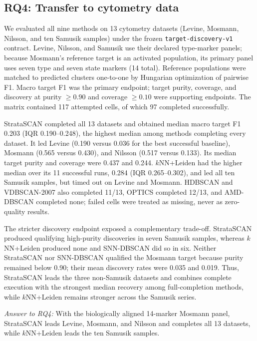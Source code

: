 \subsection{RQ4: Transfer to cytometry data}

We evaluated all nine methods on 13 cytometry datasets (Levine, Mosmann, Nilsson, and ten Samusik samples) under the frozen \texttt{target-discovery-v1} contract. Levine, Nilsson, and Samusik use their declared type-marker panels; because Mosmann's reference target is an activated population, its primary panel uses seven type and seven state markers (14 total). Reference populations were matched to predicted clusters one-to-one by Hungarian optimization of pairwise F1. Macro target F1 was the primary endpoint; target purity, coverage, and discovery at purity $\geq0.90$ and coverage $\geq0.10$ were supporting endpoints. The matrix contained 117 attempted cells, of which 97 completed successfully.

StrataSCAN completed all 13 datasets and obtained median macro target F1 0.203 (IQR 0.190--0.248), the highest median among methods completing every dataset. It led Levine (0.190 versus 0.036 for the best successful baseline), Mosmann (0.565 versus 0.430), and Nilsson (0.517 versus 0.133). Its median target purity and coverage were 0.437 and 0.244. $k$NN+Leiden had the higher median over its 11 successful runs, 0.284 (IQR 0.265--0.302), and led all ten Samusik samples, but timed out on Levine and Mosmann. HDBSCAN and VDBSCAN-2007 also completed 11/13, OPTICS completed 12/13, and AMD-DBSCAN completed none; failed cells were treated as missing, never as zero-quality results.

The stricter discovery endpoint exposed a complementary trade-off. StrataSCAN produced qualifying high-purity discoveries in seven Samusik samples, whereas $k$NN+Leiden produced none and SNN-DBSCAN did so in six. Neither StrataSCAN nor SNN-DBSCAN qualified the Mosmann target because purity remained below 0.90; their mean discovery rates were 0.035 and 0.019. Thus, StrataSCAN leads the three non-Samusik datasets and combines complete execution with the strongest median recovery among full-completion methods, while $k$NN+Leiden remains stronger across the Samusik series.

\textit{Answer to RQ4:} With the biologically aligned 14-marker Mosmann panel, StrataSCAN leads Levine, Mosmann, and Nilsson and completes all 13 datasets, while $k$NN+Leiden leads the ten Samusik samples.

